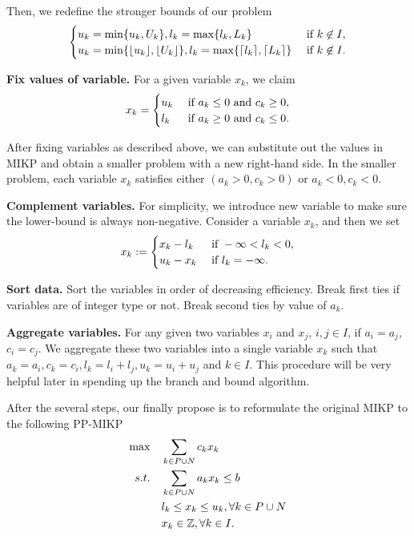 \documentclass[a4paper,11pt]{article}
\begin{document}
Then, we redefine the stronger bounds of our problem
\begin{equation}
\begin{cases}
u_k=\min\{u_k, U_k\}, l_k=\max\{l_k, L_k\} & ~\mbox{if}~ k\not \in I,\\
u_k=\min\{\lfloor u_k\rfloor, \lfloor U_k \rfloor \}, l_k=\max\{\lceil l_k \rceil, \lceil L_k\rceil\} & ~\mbox{if}~ k\not \in I.\\
\end{cases}
\end{equation}

\textbf{Fix values of variable.} For a given variable $x_k$, we claim
\begin{equation}
x_k=\begin{cases}
u_k &~\mbox{if}~ a_k\leq 0 ~\mbox{and}~ c_k \geq 0,\\
l_k &~\mbox{if}~ a_k\geq 0 ~\mbox{and}~ c_k \leq 0.\\
\end{cases}
\end{equation}

After fixing variables as described above, we can substitute out the values in MIKP and obtain a smaller problem with a new right-hand side. In the smaller problem, each variable $x_k$ satisfies either $(a_k >0, c_k>0)$ or $a_k<0, c_k<0$.

\textbf{Complement variables.} For simplicity, we introduce new variable to make sure the lower-bound is always non-negative. Consider a variable $x_k$, and then we set
\begin{equation}
x_k := \begin{cases}
x_k-l_k &~\mbox{if}~ -\infty <l_k <0,\\
u_k-x_k &~\mbox{if}~ l_k = -\infty.
\end{cases}
\end{equation}

\textbf{Sort data.} Sort the variables in order of decreasing efficiency. Break first ties if variables are of integer type or not. Break second ties by value of $a_k$.

\textbf{Aggregate variables.} For any given two variables $x_i$ and $x_j$, $i,j\in I$, if $a_i=a_j$, $c_i =c_j$. We aggregate these two variables into a single variable $x_k$ such that $a_k=a_i, c_k=c_i, l_k=l_i+l_j, u_k=u_i+u_j$ and $k\in I$. This procedure will be very helpful later in spending up the branch and bound algorithm.

After the several steps, our finally propose is to reformulate the original MIKP to the following PP-MIKP
\begin{align}
\max \quad & \sum_{k\in P\cup N} c_kx_k\\
s.t.\quad & \sum_{k\in P\cup N} a_kx_k \leq b\\
& l_k\leq x_k \leq u_k, \forall k\in P\cup N\\
&x_k\in \mathbb{Z}, \forall k\in I.
\end{align}
\end{document}

